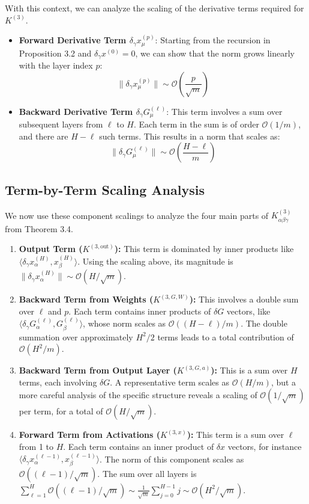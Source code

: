 \documentclass{article}
\newcommand{\Order}{\mathcal{O}}
\begin{document}
With this context, we can analyze the scaling of the derivative terms required for $K^{(3)}$.
\begin{itemize}
    \item \textbf{Forward Derivative Term $\delta_\gamma x^{(p)}_\mu$}: Starting from the recursion in Proposition 3.2 and $\delta_\gamma x^{(0)}=0$, we can show that the norm grows linearly with the layer index $p$:
    \[
    \|\delta_\gamma x^{(p)}_\mu\| \sim \Order\left(\frac{p}{\sqrt{m}}\right)
    \]
    \item \textbf{Backward Derivative Term $\delta_\gamma G^{(\ell)}_\mu$}: This term involves a sum over subsequent layers from $\ell$ to $H$. Each term in the sum is of order $\Order(1/m)$, and there are $H-\ell$ such terms. This results in a norm that scales as:
    \[
    \|\delta_\gamma G^{(\ell)}_\mu\| \sim \Order\left(\frac{H-\ell}{m}\right)
    \]
\end{itemize}


\subsection{Term-by-Term Scaling Analysis}
We now use these component scalings to analyze the four main parts of $K^{(3)}_{\alpha\beta\gamma}$ from Theorem 3.4.

\begin{enumerate}
    \item \textbf{Output Term ($K^{(3,\text{out})}$):} This term is dominated by inner products like $\langle \delta_\gamma x^{(H)}_\alpha, x^{(H)}_\beta \rangle$. Using the scaling above, its magnitude is $\|\delta_\gamma x^{(H)}_\alpha\| \sim \Order(H/\sqrt{m})$.

    \item \textbf{Backward Term from Weights ($K^{(3,G,W)}$):} This involves a double sum over $\ell$ and $p$. Each term contains inner products of $\delta G$ vectors, like $\langle \delta_\gamma G^{(\ell)}_\alpha, G^{(\ell)}_\beta \rangle$, whose norm scales as $\Order((H-\ell)/m)$. The double summation over approximately $H^2/2$ terms leads to a total contribution of $\Order(H^2/m)$.

    \item \textbf{Backward Term from Output Layer ($K^{(3,G,a)}$):} This is a sum over $H$ terms, each involving $\delta G$. A representative term scales as $\Order(H/m)$, but a more careful analysis of the specific structure reveals a scaling of $\Order(1/\sqrt{m})$ per term, for a total of $\Order(H/\sqrt{m})$.

    \item \textbf{Forward Term from Activations ($K^{(3,x)}$):} This term is a sum over $\ell$ from 1 to $H$. Each term contains an inner product of $\delta x$ vectors, for instance $\langle \delta_\gamma x^{(\ell-1)}_\alpha, x^{(\ell-1)}_\beta \rangle$. The norm of this component scales as $\Order((\ell-1)/\sqrt{m})$. The sum over all layers is $\sum_{\ell=1}^{H} \Order((\ell-1)/\sqrt{m}) \sim \frac{1}{\sqrt{m}} \sum_{j=0}^{H-1} j \sim \Order(H^2/\sqrt{m})$.
\end{enumerate}
\end{document}
